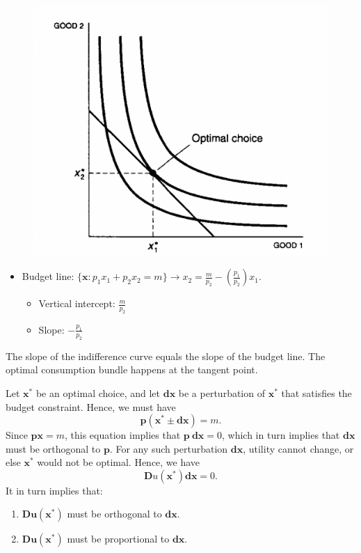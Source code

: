 \begin{figure}[H]
    \center
    \includegraphics[scale=0.5]{img/fig8-1.png}
\end{figure}
\begin{itemize}
    \item Budget line: $\{ \mathbf{x} : p_1x_1 + p_2x_2 = m \} \to x_2 = \frac{m}{p_2} - \left( \frac{p_1}{p_2} \right)x_1.$
    \begin{itemize}
        \item Vertical intercept: $\frac{m}{p_2}$
        \item Slope: $-\frac{p_1}{p_2}$
    \end{itemize}
\end{itemize}
The slope of the indifference curve equals the slope of the budget line.  
The optimal consumption bundle happens at the tangent point.

Let $\mathbf{x}^*$ be an optimal choice, and let $\mathbf{dx}$ be a perturbation of $\mathbf{x}^*$ that satisfies the budget constraint. Hence, we must have
\[
    \mathbf{p(x^* \pm dx)} = m.
\]
Since $\mathbf{px} = m$, this equation implies that $\mathbf{p \ dx} = 0$, which in turn implies that $\mathbf{dx}$ must be orthogonal to $\mathbf{p}$.  
For any such perturbation $\mathbf{dx}$, utility cannot change, or else $\mathbf{x}^*$ would not be optimal. 
Hence, we have
\[
\mathbf{D}u(\mathbf{x}^*)\mathbf{dx} = 0.
\]
It in turn implies that:

\begin{enumerate}
    \item $\mathbf{Du}(\mathbf{x}^*)$ must be orthogonal to $\mathbf{dx}$.
    \item $\mathbf{Du}(\mathbf{x}^*)$ must be proportional to $\mathbf{dx}$.
\end{enumerate}

